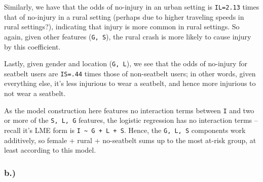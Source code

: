 \documentclass[
]{article}
\begin{document}
Similarly, we have that the odds of no-injury in an urban setting is
\texttt{IL=2.13} times that of no-injury in a rural setting (perhaps due
to higher traveling speeds in rural settings?), indicating that injury
is more common in rural settings. So again, given other features
(\texttt{G,\ S}), the rural crash is more likely to cause injury by this
coefficient.

Lastly, given gender and location (\texttt{G,\ L}), we see that the odds
of no-injury for seatbelt users are \texttt{IS=.44} times those of
non-seatbelt users; in other words, given everything else, it's less
injurious to wear a seatbelt, and hence more injurious to not wear a
seatbelt.

As the model construction here features no interaction terms between
\texttt{I} and two or more of the \texttt{S,\ L,\ G} features, the
logistic regression has no interaction terms -- recall it's LME form is
\texttt{I\ \textasciitilde{}\ G\ +\ L\ +\ S}. Hence, the
\texttt{G,\ L,\ S} components work additively, so female + rural +
no-seatbelt sums up to the most at-risk group, at least according to
this model.

\hypertarget{b.-4}{%
\subsubsection{b.)}\label{b.-4}}
\end{document}
